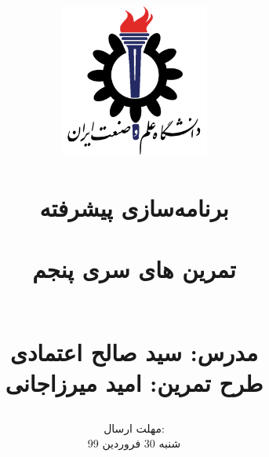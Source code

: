 \title{
    \center
    \includegraphics[width=5cm, height=5cm]{images/IUST_logo_color.png} \\
    \textsc{} \\
    [25pt] 
    
برنامه‌سازی پیشرفته\\
\\تمرین های سری پنجم

 \textsc{\rl{}} \\

مدرس: سید صالح اعتمادی \\

طرح تمرین: امید میرزاجانی
}
\author{
\selectfont
}
\date{
    مهلت ارسال:\\
شنبه 30 فروردین 99
}